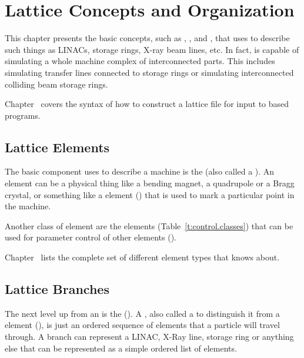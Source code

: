 \chapter{Lattice Concepts and Organization}
\label{c:lat.concepts}

This chapter presents the basic concepts, such as ,
, and , that \bmad uses to describe such things
as LINACs, storage rings, X-ray beam lines, etc.  In fact, \bmad is
capable of simulating a whole machine complex of interconnected parts.
This includes simulating transfer lines connected to storage rings or 
simulating interconnected colliding beam storage rings.

Chapter~ covers the syntax of how to construct a
lattice file for input to \bmad based programs.

\section{Lattice Elements}
\label{s:element.def}

The basic component \bmad uses to describe a machine is the
 (also called a ).  An element can be
a physical thing like a bending magnet, a quadrupole or a Bragg
crystal, or something like a  element ()
that is used to mark a particular point in the machine.

Another class of element are the  elements
(Table~\ref{t:control.classes}) that can be used for parameter control
of other elements ().

Chapter~ lists the complete set of different element
types that \bmad knows about.

\section{Lattice Branches}
\label{s:branch.def}

The next level up from an  is the 
().  A , also called a  to distinguish it from a  element
(), is just an ordered sequence of elements that a
particle will travel through. A branch can represent a LINAC, X-Ray
line, storage ring or anything else that can be represented as a
simple ordered list of elements. 

